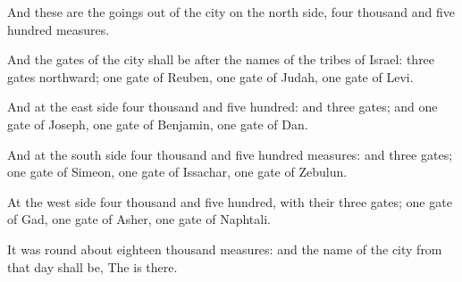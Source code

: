 \Verse And these are the goings out of the city on the north side, four thousand and five hundred measures.

\Verse And the gates of the city shall be after the names of the tribes of Israel: three gates northward; one gate of Reuben, one gate of Judah, one gate of Levi.

\Verse And at the east side four thousand and five hundred: and three gates; and one gate of Joseph, one gate of Benjamin, one gate of Dan.

\Verse And at the south side four thousand and five hundred measures: and three gates; one gate of Simeon, one gate of Issachar, one gate of Zebulun.

\Verse At the west side four thousand and five hundred, with their three gates; one gate of Gad, one gate of Asher, one gate of Naphtali.

\Verse It was round about eighteen thousand measures: and the name of the city from that day shall be, The \LORD is there.


